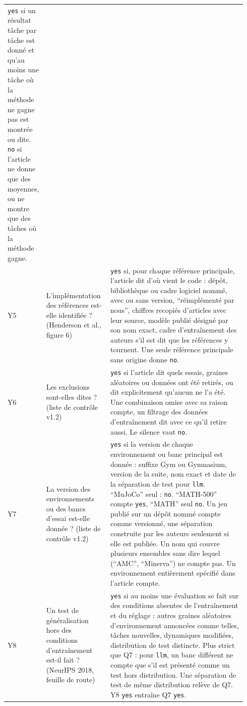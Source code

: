 \begin{small}
\begin{longtable}{@{}p{0.07\linewidth}>{\raggedright\arraybackslash}p{0.27\linewidth}>{\raggedright\arraybackslash}p{0.6\linewidth}@{}}
  \texttt{yes} si un résultat tâche par tâche est donné et qu'au moins une tâche où la méthode ne
  gagne pas est montrée ou dite. \texttt{no} si l'article ne donne que des moyennes, ou ne montre que
  des tâches où la méthode gagne. \\
Y5 & L'implémentation des références est-elle identifiée ? (Henderson et al., figure 6) &
  \texttt{yes} si, pour chaque référence principale, l'article dit d'où vient le code : dépôt,
  bibliothèque ou cadre logiciel nommé, avec ou sans version, \enquote{réimplémenté par nous},
  chiffres recopiés d'articles avec leur source, modèle publié désigné par son nom exact, cadre
  d'entraînement des auteurs s'il est dit que les références y tournent. Une
  seule référence principale sans origine donne \texttt{no}. \\
Y6 & Les exclusions sont-elles dites ? (liste de contrôle v1.2) & \texttt{yes} si l'article dit
  quels essais, graines aléatoires ou données ont été retirés, ou dit explicitement qu'aucun ne l'a été. Une
  combinaison omise avec sa raison compte, un filtrage des données d'entraînement dit avec
  ce qu'il retire aussi. Le silence vaut \texttt{no}. \\
Y7 & La version des environnements ou des bancs d'essai est-elle donnée ? (liste de contrôle v1.2)
  & \texttt{yes} si la version de chaque environnement ou banc principal est donnée : suffixe Gym ou
  Gymnasium, version de la suite, nom exact et date de la séparation de test pour \texttt{llm}.
  \enquote{MuJoCo} seul : \texttt{no}. \enquote{MATH-500} compte \texttt{yes}, \enquote{MATH} seul
  \texttt{no}. Un jeu publié sur un dépôt nommé compte comme versionné, une séparation construite par
  les auteurs seulement si elle est publiée. Un nom qui couvre plusieurs ensembles sans
  dire lequel (\enquote{AMC}, \enquote{Minerva}) ne compte pas. Un environnement entièrement spécifié
  dans l'article compte. \\
Y8 & Un test de généralisation hors des conditions d'entraînement est-il fait ? (NeurIPS 2018,
  feuille de route) & \texttt{yes} si au moins une évaluation se fait sur des conditions absentes de
  l'entraînement et du réglage : autres graines aléatoires d'environnement annoncées comme telles, tâches
  nouvelles, dynamiques modifiées, distribution de test distincte. Plus strict que Q7 : pour
  \texttt{llm}, un banc différent ne compte que s'il est présenté comme un test hors distribution.
  Une séparation de test de même distribution relève de Q7. Y8 \texttt{yes} entraîne Q7 \texttt{yes}. \\

\end{longtable}
\end{small}
